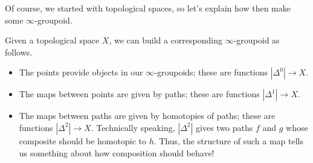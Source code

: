 \documentclass[../notes.tex]{subfiles}
\begin{document}
Of course, we started with topological spaces, so let's explain how then make some $\infty$-groupoid.
\begin{example}
	Given a topological space $X$, we can build a corresponding $\infty$-groupoid as follows.
	\begin{itemize}
		\item The points provide objects in our $\infty$-groupoids; these are functions $\left|\Delta^0\right|\to X$.
		\item The maps between points are given by paths; these are functions $\left|\Delta^1\right|\to X$.
		\item The maps between paths are given by homotopies of paths; these are functions $\left|\Delta^2\right|\to X$. Technically speaking, $\left|\Delta^2\right|$ gives two paths $f$ and $g$ whose composite should be homotopic to $h$. Thus, the structure of such a map tells us something about how composition should behave!
	\end{itemize}
\end{example}
\end{document}
